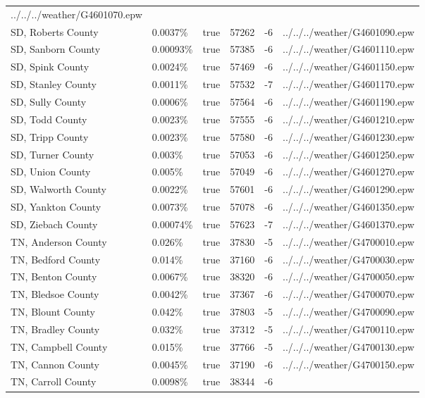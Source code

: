 \begin{longtable}[]{@{}llllll@{}}
../../../weather/G4601070.epw \\
SD, Roberts County & 0.0037\% & true & 57262 & -6 &
../../../weather/G4601090.epw \\
SD, Sanborn County & 0.00093\% & true & 57385 & -6 &
../../../weather/G4601110.epw \\
SD, Spink County & 0.0024\% & true & 57469 & -6 &
../../../weather/G4601150.epw \\
SD, Stanley County & 0.0011\% & true & 57532 & -7 &
../../../weather/G4601170.epw \\
SD, Sully County & 0.0006\% & true & 57564 & -6 &
../../../weather/G4601190.epw \\
SD, Todd County & 0.0023\% & true & 57555 & -6 &
../../../weather/G4601210.epw \\
SD, Tripp County & 0.0023\% & true & 57580 & -6 &
../../../weather/G4601230.epw \\
SD, Turner County & 0.003\% & true & 57053 & -6 &
../../../weather/G4601250.epw \\
SD, Union County & 0.005\% & true & 57049 & -6 &
../../../weather/G4601270.epw \\
SD, Walworth County & 0.0022\% & true & 57601 & -6 &
../../../weather/G4601290.epw \\
SD, Yankton County & 0.0073\% & true & 57078 & -6 &
../../../weather/G4601350.epw \\
SD, Ziebach County & 0.00074\% & true & 57623 & -7 &
../../../weather/G4601370.epw \\
TN, Anderson County & 0.026\% & true & 37830 & -5 &
../../../weather/G4700010.epw \\
TN, Bedford County & 0.014\% & true & 37160 & -6 &
../../../weather/G4700030.epw \\
TN, Benton County & 0.0067\% & true & 38320 & -6 &
../../../weather/G4700050.epw \\
TN, Bledsoe County & 0.0042\% & true & 37367 & -6 &
../../../weather/G4700070.epw \\
TN, Blount County & 0.042\% & true & 37803 & -5 &
../../../weather/G4700090.epw \\
TN, Bradley County & 0.032\% & true & 37312 & -5 &
../../../weather/G4700110.epw \\
TN, Campbell County & 0.015\% & true & 37766 & -5 &
../../../weather/G4700130.epw \\
TN, Cannon County & 0.0045\% & true & 37190 & -6 &
../../../weather/G4700150.epw \\
TN, Carroll County & 0.0098\% & true & 38344 & -6 &

\end{longtable}

